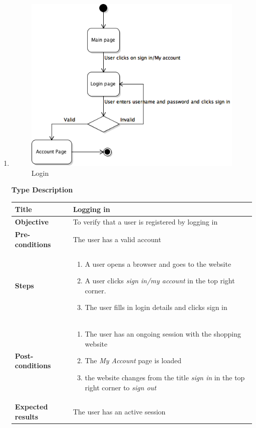 \documentclass[UKenglish,12pt]{article}
\begin{document}
\begin{enumerate}
\item
\begin{figure}[H]
\centering
\includegraphics[scale=0.7,keepaspectratio]{Images/Login.png}
\caption{Login}
\end{figure}


\textbf{\hspace{0.3cm}Type\hspace{4.4cm} Description}
\newline \vspace{0.2cm}
\begin{tabular}{| p{5cm} | p{10cm} | }
	\hline
	 \textbf{Title} & Logging in\\ \hline
	 \textbf{Objective} & To verify that a user is registered by logging in\\ \hline
	 \textbf{Pre-conditions} & The user has a valid account\\ \hline
	 \textbf{Steps} & \begin{enumerate} \item A user opens a browser and goes to the website \item A user clicks \textit{sign in/my account} in the top right corner. \item The user fills in login details and clicks sign in \end{enumerate} \\ \hline
	 \textbf{Post-conditions} & \begin{enumerate} \item The user has an ongoing session with the shopping website \item The \textit{My Account} page is loaded \item the website changes from the title \textit{sign in} in the top right corner to \textit{sign out} \end{enumerate} \\ \hline
	 \textbf{Expected results} & The user has an active session  \\ 
	 \hline
\end{tabular} %



\end{enumerate}
\end{document}
